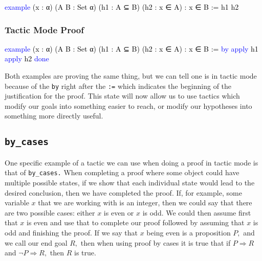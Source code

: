 \documentclass[
  letterpaper,
]{scrreprt}
\newenvironment{Shaded}{\begin{snugshade}}{\end{snugshade}}
\newcommand{\KeywordTok}[1]{\textcolor[rgb]{0.00,0.23,0.31}{#1}}
\newcommand{\NormalTok}[1]{\textcolor[rgb]{0.00,0.23,0.31}{#1}}
\renewcommand{\NormalTok}[1]{\textcolor[HTML]{000000}{#1}}
\renewcommand{\KeywordTok}[1]{\textcolor[HTML]{0000FF}{#1}}
\theoremstyle{remark}
\begin{document}
\begin{Shaded}
\begin{Highlighting}[]
\KeywordTok{example}\NormalTok{ (x : α) (A B : Set α) (h1 : A ⊆ B) }
\NormalTok{    (h2 : x ∈ A) : x ∈ B := h1 h2}
\end{Highlighting}
\end{Shaded}

\hypertarget{tactic-mode-proof}{%
\subsubsection{Tactic Mode Proof}\label{tactic-mode-proof}}

\begin{Shaded}
\begin{Highlighting}[]
\KeywordTok{example}\NormalTok{ (x : α) (A B : Set α) (h1 : A ⊆ B) }
\NormalTok{    (h2 : x ∈ A) : x ∈ B := }\KeywordTok{by}
  \KeywordTok{apply}\NormalTok{ h1}
  \KeywordTok{apply}\NormalTok{ h2}
  \KeywordTok{done}
\end{Highlighting}
\end{Shaded}

Both examples are proving the same thing, but we can tell one is in
tactic mode because of the \texttt{by} right after the \texttt{:=} which
indicates the beginning of the justification for the proof. This state
will now allow us to use tactics which modify our goals into something
easier to reach, or modify our hypotheses into something more directly
useful.

\hypertarget{by_cases}{%
\subsection{\texorpdfstring{\texttt{by\_cases}}{by\_cases}}\label{by_cases}}

One specific example of a tactic we can use when doing a proof in tactic
mode is that of \texttt{by\_cases.} When completing a proof where some
object could have multiple possible states, if we show that each
individual state would lead to the desired conclusion, then we have
completed the proof. If, for example, some variable \(x\) that we are
working with is an integer, then we could say that there are two
possible cases: either \(x\) is even or \(x\) is odd. We could then
assume first that \(x\) is even and use that to complete our proof
followed by assuming that \(x\) is odd and finishing the proof. If we
say that \(x\) being even is a proposition \(P,\) and we call our end
goal \(R,\) then when using proof by cases it is true that if
\(P \Rightarrow R\) and \(\neg P \Rightarrow R,\) then \(R\) is true.
\end{document}
